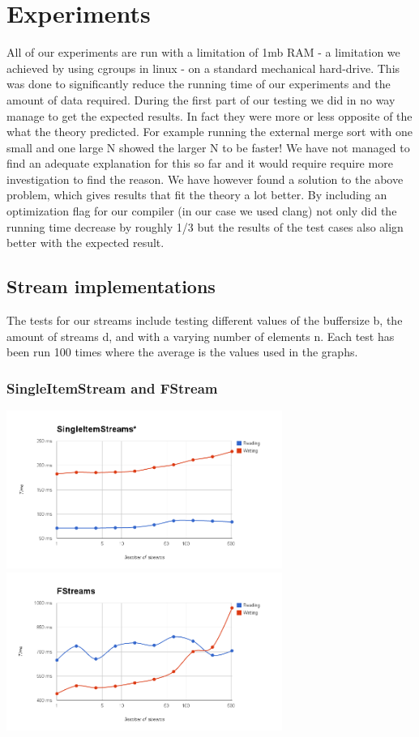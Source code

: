\section{Experiments}

All of our experiments are run with a limitation of 1mb RAM - a limitation we achieved by using cgroups in linux - on a standard mechanical hard-drive. This was done to significantly reduce the running time of our experiments and the amount of data required. 
During the first part of our testing we did in no way manage to get the expected results. In fact they were more or less opposite of the what the theory predicted. For example running the external merge sort with one small and one large N showed the larger N to be faster! We have not managed to find an adequate explanation for this so far and it would require require more investigation to find the reason.
We have however found a solution to the above problem, which gives results that fit the theory a lot better. By including an optimization flag for our compiler (in our case we used clang) not only did the running time decrease by roughly 1/3 but the results of the test cases also align better with the expected result. 

\subsection{Stream implementations}
The tests for our streams include testing different values of the buffersize b, the amount of streams d, and with a varying number of elements n. 
Each test has been run 100 times where the average is the values used in the graphs. 

\subsubsection{SingleItemStream and FStream}
\includegraphics[width=90mm]{parts/SIS.png}
\includegraphics[width=90mm]{parts/FS.png}

